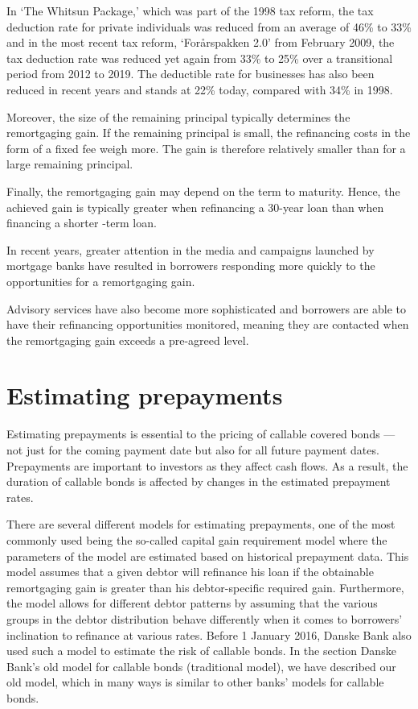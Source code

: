 \documentclass[12pt,twoside]{reedthesis}
\begin{document}
In `The Whitsun Package,' which was part of the 1998 tax reform, the tax deduction rate for private individuals was reduced from an average of 46\% to 33\% and in the most recent tax reform, `Forårspakken 2.0' from February 2009, the tax deduction rate was reduced yet again from 33\% to 25\% over a transitional period from 2012 to 2019. The deductible rate for businesses has also been reduced in recent years and stands at 22\% today, compared with 34\% in 1998.

Moreover, the size of the remaining principal typically determines the remortgaging gain. If the remaining principal is small, the refinancing costs in the form of a fixed fee weigh more. The gain is therefore relatively smaller than for a large remaining principal.

Finally, the remortgaging gain may depend on the term to maturity. Hence, the achieved gain is typically greater when refinancing a 30-year loan than when financing a shorter -term loan.

In recent years, greater attention in the media and campaigns launched by mortgage banks have resulted in borrowers responding more quickly to the opportunities for a remortgaging gain.

Advisory services have also become more sophisticated and borrowers are able to have their refinancing opportunities monitored, meaning they are contacted when the remortgaging gain exceeds a pre-agreed level.

\hypertarget{estimating-prepayments}{%
\section{Estimating prepayments}\label{estimating-prepayments}}

Estimating prepayments is essential to the pricing of callable covered bonds --- not just for the coming payment date but also for all future payment dates. Prepayments are important to investors as they affect cash flows. As a result, the duration of callable bonds is affected by changes in the estimated prepayment rates.

There are several different models for estimating prepayments, one of the most commonly used being the so-called capital gain requirement model where the parameters of the model are estimated based on historical prepayment data. This model assumes that a given debtor will refinance his loan if the obtainable remortgaging gain is greater than his debtor-specific required gain. Furthermore, the model allows for different debtor patterns by assuming that the various groups in the debtor distribution behave differently when it comes to borrowers' inclination to refinance at various rates. Before 1 January 2016, Danske Bank also used such a model to estimate the risk of callable bonds. In the section Danske Bank's old model for callable bonds (traditional model), we have described our old model, which in many ways is similar to other banks' models for callable bonds.
\end{document}

